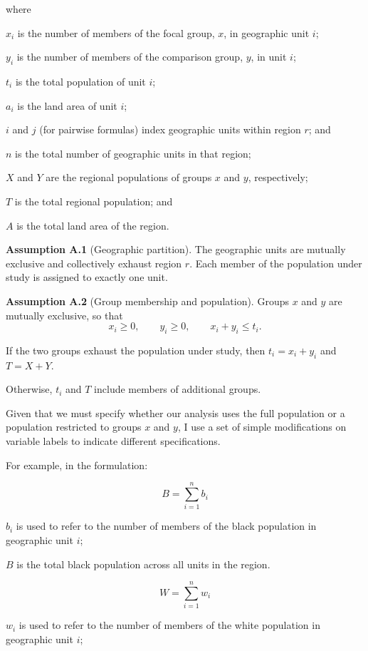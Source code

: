 \documentclass{report}[11pt,letterpaper]
\begin{document}
\noindent
where 

$x_i$ is the number of members of the focal group,
$x$, in geographic unit $i$; 

$y_i$ is the number of members
of the comparison group, $y$, in unit $i$; 

$t_i$ is the
total population of unit $i$; 

$a_i$ is the land area of
unit $i$; 

$i$ and $j$ (for pairwise formulas) index geographic units within region $r$; and 

$n$ is the total number of geographic units in that
region;

$X$ and $Y$ are the regional
populations of groups $x$ and $y$, respectively; 

$T$ is the total regional population; and 

$A$ is the total
land area of the region.


\bigskip

\noindent
\textbf{Assumption A.1} (Geographic partition).
The geographic units are mutually exclusive and collectively
exhaust region $r$.  Each member of the population under
study is assigned to exactly one unit.


\medskip

\noindent
\textbf{Assumption A.2} (Group membership and population).
Groups $x$ and $y$ are mutually exclusive, so that
\[
x_i \geq 0, \qquad y_i \geq 0, \qquad
x_i+y_i \leq t_i.
\]

If the two groups exhaust the population under study,
then $t_i=x_i+y_i$ and $T=X+Y$. 

Otherwise, $t_i$ and $T$ include members of additional groups. 

Given that we must specify whether our analysis uses the full population or a population restricted to groups $x$ and $y$, I use a set of simple modifications on variable labels to indicate different specifications. 

For example, in the formulation:

$$B = \sum_{i=1}^{n} b_i$$

$b_i$ is used to refer to the number of members of the black population in geographic unit $i$;

$B$ is the total black population across all units in the region.

$$W = \sum_{i=1}^{n} w_i$$

$w_i$ is used to refer to the number of members of the white population in geographic unit $i$;
\end{document}

